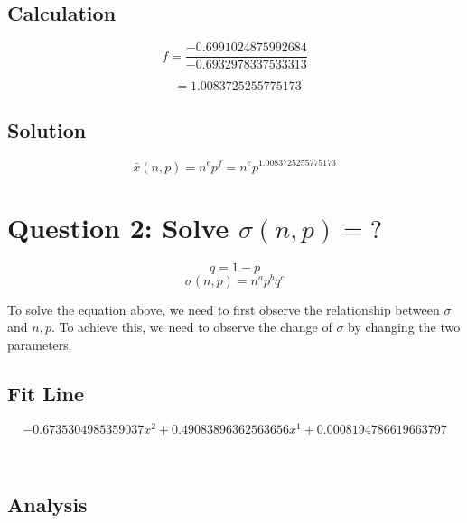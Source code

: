 \documentclass{article}
\begin{document}
    \begin{Verbatim}[commandchars=\\\{\}]

\end{Verbatim}

    \subsection{Calculation}\label{calculation}

    
    $$f = \frac{-0.6991024875992684}{-0.6932978337533313}$$

    
    $$\ \  = 1.0083725255775173$$

    
    \subsection{Solution}\label{solution}

    
    $$\boxed{\bar{x}(n, p) = n^ep^f = n^ep^{1.0083725255775173}}$$

    
    \section{\texorpdfstring{Question 2: Solve
\(\sigma (n, p) = ?\)}{Question 2: Solve \textbackslash{}sigma (n, p) = ?}}\label{question-2-solve-sigma-n-p}

\[q = 1 - p\] \[\sigma(n, p) = n^ap^bq^c\]

To solve the equation above, we need to first observe the relationship
between \(\sigma\) and \(n, p\). To achieve this, we need to observe the
change of \(\sigma\) by changing the two parameters.

\subsection{Fit Line}\label{fit-line}

    $$-0.6735304985359037x^2+0.49083896362563656x^1+0.0008194786619663797$$

    
    \begin{center}
    \end{center}
    { \hspace*{\fill} \\}
    
    \subsection{Analysis}\label{analysis}
\end{document}
